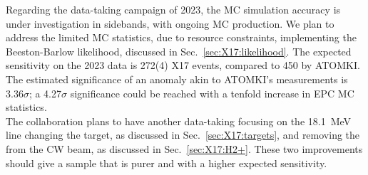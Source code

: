 \begin{refsection}
    \noindent
    Regarding the data-taking campaign of 2023, the MC simulation accuracy is under investigation in sidebands, with ongoing MC production. 
    We plan to address the limited MC statistics, due to resource constraints, implementing the Beeston-Barlow likelihood, discussed in Sec.~\ref{sec:X17:likelihood}. 
    The expected sensitivity on the 2023 data is 272(4) X17 events, compared to 450 by ATOMKI.
    The estimated significance of an anomaly akin to ATOMKI's measurements is 3.36$\sigma$; a 4.27$\sigma$ significance could be reached with a tenfold increase in EPC MC statistics.\\
    
    \noindent
    The collaboration plans to have another data-taking focusing on the \SI{18.1}{MeV} line changing the target, as discussed in Sec.~\ref{sec:X17:targets}, and removing the  from the CW beam, as discussed in Sec.~\ref{sec:X17:H2+}. 
    These two improvements should give a sample that is purer and with a higher expected sensitivity.

\printbibliography[
    heading = bibliographychapter,
    title=Bibliography on X17
]

\end{refsection}
